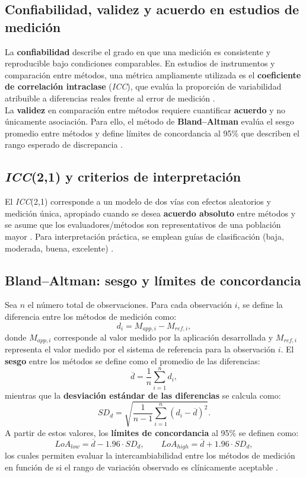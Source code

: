 \documentclass[12pt]{report}
\begin{document}
\begin{justify}
    \section{Confiabilidad, validez y acuerdo en estudios de medición}
    La \textbf{confiabilidad} describe el grado en que una medición es consistente y
    reproducible bajo condiciones comparables. En estudios de instrumentos y
    comparación entre métodos, una métrica ampliamente utilizada es el \textbf{coeficiente
        de correlación intraclase} (\textit{ICC}), que evalúa la proporción de
    variabilidad atribuible a diferencias reales frente al error de medición
    \cite{ShroutFleiss1979,McGrawWong1996}.\\

    La \textbf{validez} en comparación entre métodos requiere cuantificar \textbf{acuerdo} y no únicamente asociación. Para ello, el método de \textbf{Bland--Altman} evalúa el sesgo promedio entre métodos y define
    límites de concordancia al 95\% que describen el rango esperado de discrepancia
    \cite{BlandAltman1986}.\\
    \subsection{\textit{ICC}(2,1) y criterios de interpretación}
    El \textit{ICC}(2,1) corresponde a un modelo de dos vías con efectos aleatorios
    y medición única, apropiado cuando se desea \textbf{acuerdo absoluto} entre
    métodos y se asume que los evaluadores/métodos son representativos de una
    población mayor \cite{ShroutFleiss1979,McGrawWong1996}. Para interpretación práctica,
    se emplean guías de clasificación (baja, moderada, buena, excelente) \cite{KooLi2016}.\\
    \subsection{Bland--Altman: sesgo y límites de concordancia}
    Sea $n$ el número total de observaciones. Para cada observación $i$, se define la
    diferencia entre los métodos de medición como:
    \[
        d_{i} = M_{app,i}- M_{ref,i},
    \]
    donde $M_{app,i}$ corresponde al valor medido por la aplicación desarrollada y
    $M_{ref,i}$ representa el valor medido por el sistema de referencia para la
    observación $i$. El \textbf{sesgo} entre los métodos se define como el promedio
    de las diferencias:
    \[
        \overline{d}= \frac{1}{n}\sum_{i=1}^{n}d_{i},
    \]
    mientras que la \textbf{desviación estándar de las diferencias} se calcula como:
    \[
        SD_{d} = \sqrt{\frac{1}{n-1}\sum_{i=1}^{n} (d_{i} - \overline{d})^{2}}.
    \]
    A partir de estos valores, los \textbf{límites de concordancia} al 95\% se
    definen como:
    \[
        LoA_{low}= \overline{d}- 1.96 \cdot SD_{d}, \qquad LoA_{high}= \overline{d}+ 1.
        96 \cdot SD_{d},
    \]
    los cuales permiten evaluar la intercambiabilidad entre los métodos de medición en
    función de si el rango de variación observado es clínicamente aceptable \cite{BlandAltman1986}.

\end{justify}
\end{document}
